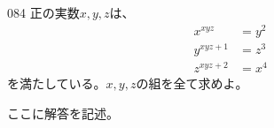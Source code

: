 \begin{prob}{084}{\maru}{}
 正の実数$x, y, z$は、
 \begin{align*}
  x^{xyz}&=y^2 \\
  y^{xyz+1}&=z^3 \\
  z^{xyz+2}&=x^4
 \end{align*}
 を満たしている。$x, y, z$の組を全て求めよ。
\end{prob}
ここに解答を記述。